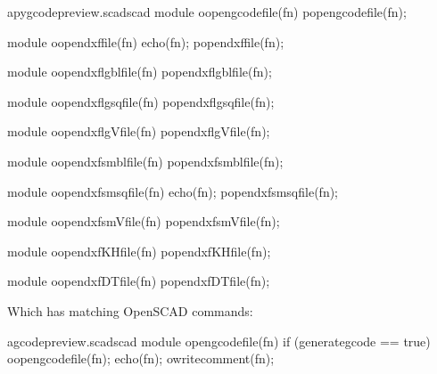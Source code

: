 \documentclass{ltxdoc}
\begin{document}
\lstset{firstnumber=\thepyscad}
\begin{writecode}{a}{pygcodepreview.scad}{scad}
module oopengcodefile(fn) {
    popengcodefile(fn);
}

module oopendxffile(fn) {
    echo(fn);
    popendxffile(fn);
}

module oopendxflgblfile(fn) {
    popendxflgblfile(fn);
}

module oopendxflgsqfile(fn) {
    popendxflgsqfile(fn);
}

module oopendxflgVfile(fn) {
    popendxflgVfile(fn);
}

module oopendxfsmblfile(fn) {
    popendxfsmblfile(fn);
}

module oopendxfsmsqfile(fn) {
    echo(fn);
    popendxfsmsqfile(fn);
}

module oopendxfsmVfile(fn) {
    popendxfsmVfile(fn);
}

module oopendxfKHfile(fn) {
    popendxfKHfile(fn);
}

module oopendxfDTfile(fn) {
    popendxfDTfile(fn);
}

\end{writecode}
\addtocounter{pyscad}{42}

Which has matching OpenSCAD commands:
 
\lstset{firstnumber=\thegcpscad}
\begin{writecode}{a}{gcodepreview.scad}{scad}
module opengcodefile(fn) {
if (generategcode == true) {
    oopengcodefile(fn);
    echo(fn);
    owritecomment(fn);
    }
}

\end{writecode}
\addtocounter{gcpscad}{8}
\end{document}
